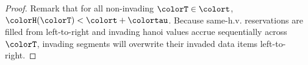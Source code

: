 \begin{proof}
Remark that for all non-invading $\colorT \in \colort$, $\colorH(\colorT) < \colort + \colortau$.
Because same-h.v. reservations are filled from left-to-right and invading hanoi values accrue sequentially across $\colorT$, invading segments will overwrite their invaded data items left-to-right.
\end{proof}
